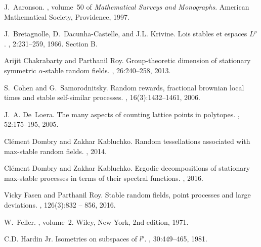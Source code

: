\documentclass[12pt]{amsart}
\begin{document}
\begin{thebibliography}{10}
	
	J.~Aaronson.
	, volume~50 of {\em
		Mathematical Surveys and Monographs}.
	\newblock American Mathematical Society, Providence, 1997.
	
	J.~Bretagnolle, D.~Dacunha-Castelle, and J.L. Krivine.
	\newblock Lois stables et espaces ${L}^p$.
	, 2:231--259, 1966.
	\newblock Section B.
	
	Arijit Chakrabarty and Parthanil Roy.
	\newblock Group-theoretic dimension of stationary symmetric $\alpha$-stable
	random fields.
	, 26:240--258, 2013.
	
	S.~Cohen and G.~Samorodnitsky.
	\newblock Random rewards, fractional brownian local times and stable
	self-similar processes.
	, 16(3):1432--1461, 2006.
	
	J.~A. De~Loera.
	\newblock The many aspects of counting lattice points in polytopes.
	, 52:175--195, 2005.
	
	Cl{\'e}ment Dombry and Zakhar Kabluchko.
	\newblock Random tessellations associated with max-stable random fields.
	, 2014.
	
	Cl{\'e}ment Dombry and Zakhar Kabluchko.
	\newblock Ergodic decompositions of stationary max-stable processes in terms of
	their spectral functions.
	, 2016.
	
	Vicky Fasen and Parthanil Roy.
	\newblock Stable random fields, point processes and large deviations.
	, 126(3):832 -- 856,
	2016.
	
	W.~Feller.
	,
	volume~2.
	\newblock Wiley, New York, 2nd edition, 1971.
	
	C.D. {Hardin Jr.}
	\newblock Isometries on subspaces of $l^p$.
	, 30:449--465, 1981.
	

\end{thebibliography}
\end{document}
